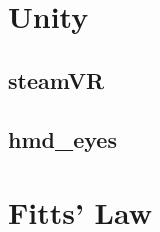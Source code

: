 
\cite{PaperPupilLabs}

\section{Unity}

\subsection{steamVR}

\subsection{hmd\_eyes}

\section{Fitts' Law}